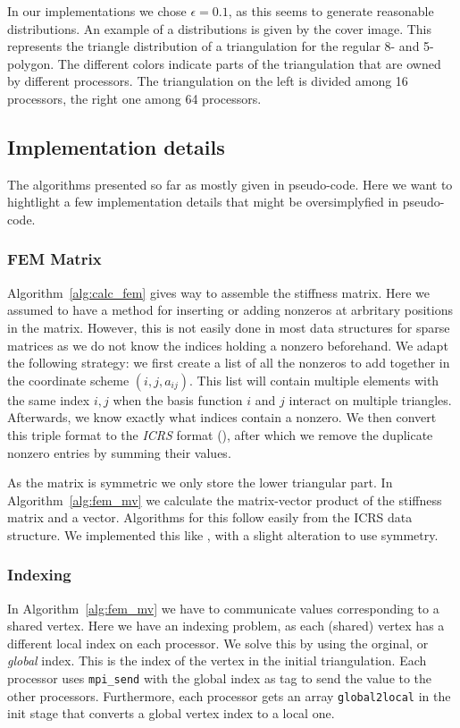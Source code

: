 \documentclass[11pt]{amsart}
\theoremstyle{definition}
\begin{document}
In our implementations we chose $\epsilon = 0.1$, as this seems to generate reasonable distributions. An example of a distributions is given by the cover image. This represents the triangle distribution of a triangulation for the  regular 8- and 5-polygon. The different colors indicate parts of the triangulation that are owned by different processors. The triangulation on the left is divided among 16 processors, the right one among 64 processors. 
\subsection{Implementation details}
The algorithms presented so far as mostly given in pseudo-code. Here we want to hightlight a few implementation details that might be oversimplyfied in pseudo-code.
\subsubsection*{FEM Matrix}
Algorithm~\ref{alg:calc_fem} gives way to assemble the stiffness matrix. Here
we assumed to have a method for inserting or adding nonzeros at arbritary positions in the matrix. However,
this is not easily done in most data structures for sparse matrices as we do not know the
indices holding a nonzero beforehand. We adapt the following strategy: we first create a list
of all the nonzeros to add together in the coordinate scheme $(i,j,a_{ij})$.
This list will contain multiple elements with the same index $i,j$ when
the basis function $i$ and $j$ interact on multiple triangles. Afterwards, we know
exactly what indices contain a nonzero. We then convert this triple format to the \emph{ICRS}
format (\cite[p.~171]{biss04}), after which we remove the duplicate nonzero entries by summing their values.

As the matrix is symmetric we only store the lower triangular part. In Algorithm~\ref{alg:fem_mv}
we calculate the matrix-vector product of the stiffness matrix and a vector. Algorithms for this
follow easily from the ICRS data structure. We implemented this like \cite[Alg.~4.4]{biss04}, with
a slight alteration to use symmetry.

\subsubsection*{Indexing}
In Algorithm~\ref{alg:fem_mv} we have to communicate values corresponding to a shared vertex. Here we have an indexing problem, as each (shared) vertex has a different local index on each processor. We solve this by using the orginal, or \emph{global} index. This is the index of the vertex in the initial triangulation. Each processor uses \verb=mpi_send= with the global index as tag to send the value to the other processors. Furthermore, each processor gets an array \verb=global2local= in the init stage that converts a global vertex index to a local one.
\end{document}
